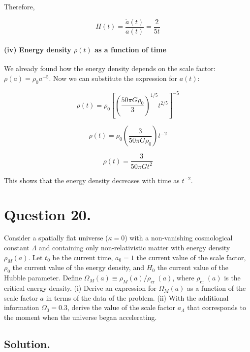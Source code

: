 \documentclass{article}
\begin{document}
Therefore,

\begin{equation}
H(t) = \frac{\dot{a}(t)}{a(t)} = \frac{2}{5t}
\end{equation}

\paragraph{(iv) Energy density $\rho(t)$ as a function of time}

We already found how the energy density depends on the scale factor: $\rho(a) = \rho_0 a^{-5}$. Now we can substitute the expression for $a(t)$:

\begin{equation}
\rho(t) = \rho_0 \left[\left(\frac{50\pi G \rho_0}{3}\right)^{1/5} t^{2/5}\right]^{-5}
\end{equation}

\begin{equation}
\rho(t) = \rho_0 \left(\frac{3}{50\pi G \rho_0}\right) t^{-2}
\end{equation}

\begin{equation}
\rho(t) = \frac{3}{50\pi G t^2}
\end{equation}

This shows that the energy density decreases with time as $t^{-2}$.


\pagebreak

\section*{Question 20.} Consider a spatially flat universe ($\kappa=0$) with a non-vanishing cosmological constant $\Lambda$ and containing only non-relativistic matter with energy density $\rho_{M}(a)$. Let $t_{0}$ be the current time, $a_{0}=1$ the current value of the scale factor, $\rho_{0}$ the current value of the energy density, and $H_{0}$ the current value of the Hubble parameter. Define $\Omega_{M}(a) \equiv \rho_{M}(a) / \rho_{\text {cr }}(a)$, where $\rho_{\text {cr }}(a)$ is the critical energy density. (i) Derive an expression for $\Omega_{M}(a)$ as a function of the scale factor $a$ in terms of the data of the problem. (ii) With the additional information $\Omega_{0}=0.3$, derive the value of the scale factor $a_{\Lambda}$ that corresponds to the moment when the universe began accelerating.

\bigskip

\subsection*{Solution.}
\end{document}
